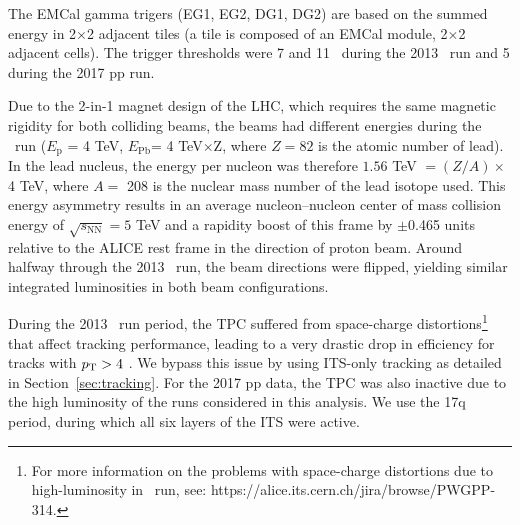 The EMCal gamma trigers (EG1, EG2, DG1, DG2) are based on the summed energy in 2$\times$2 adjacent tiles (a tile is composed of an EMCal module, 2$\times$2 adjacent cells). The trigger thresholds were 7 and 11 \GeVc~during the 2013 \pPb~run and {5 \GeVc} during the 2017 pp run. %

Due to the 2-in-1 magnet design of the LHC, which requires the same magnetic rigidity for both colliding beams, the beams had different energies during the \pPb~run ({$E_{\mathrm{p}}$ = 4 TeV}, {$E_{\mathrm{Pb}} $= 4 TeV$\times$Z}, where $Z=82$ is the atomic number of lead). In the lead nucleus, the energy per nucleon was therefore  {$1.56$ TeV $= (Z/A) \times$ 4 TeV}, where $A =$ 208 is the nuclear
mass number of the lead isotope used. This energy asymmetry results in an average nucleon--nucleon center of mass collision energy of {$\sqrt{s_{\mathrm{NN}}}=5 $ TeV} and a rapidity boost of this frame by $\pm$0.465 units relative to the ALICE rest frame in the direction of proton beam. Around halfway through the 2013 \pPb~run, the beam directions were flipped, yielding similar integrated luminosities in both beam configurations. %

During the 2013 \pPb~run period, the TPC suffered from space-charge distortions\footnote{For more information on the problems with space-charge distortions due to high-luminosity in \pPb~run, see: https://alice.its.cern.ch/jira/browse/PWGPP-314.} that affect tracking performance, leading to a very drastic drop in efficiency for tracks with $p_{\mathrm{T}}> 4$ \GeVc. We bypass this issue by using ITS-only tracking as detailed in Section~\ref{sec:tracking}.
For the 2017 pp data, the TPC was also inactive due to the high luminosity of the runs considered in this analysis. We use the 17q period, during which all six layers of the ITS were active.

